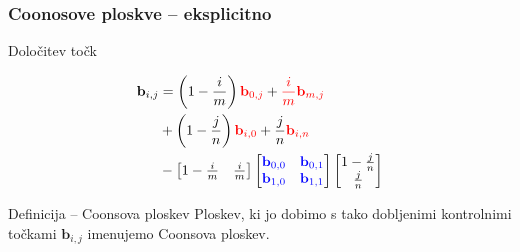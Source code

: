 \documentclass{beamer}
\begin{document}
\begin{frame}
    \frametitle{Coonosove ploskve -- eksplicitno}
    \begin{block}{Določitev točk}
    
        \begin{align*}
            \mathbf{b}_{i,j} &= \left(1 - \frac{i}{m}\right) \color{red} \mathbf{b}_{0,j} \color{black}+\color{red}\frac{i}{m}\mathbf{b}_{m,j}\\
             &+ \left(1 - \frac{j}{n}\right)\color{red}\mathbf{b}_{i,0} \color{black}+\frac{j}{n} \color{red}\mathbf{b}_{i,n}\ \\
            &- 
            \begin{bmatrix} 
               1 - \frac{i}{m} & \frac{i}{m}
            \end{bmatrix}
            \begin{bmatrix} 
                \color{blue} \mathbf{b}_{0,0} &  \color{blue} \mathbf{b}_{0,1}\\
                \color{blue} \mathbf{b}_{1,0} &  \color{blue} \mathbf{b}_{1,1}
            \end{bmatrix}
            \begin{bmatrix}
               1 - \frac{j}{n}\\
               \frac{j}{n}
            \end{bmatrix}
         \end{align*}
\end{block}
    

\begin{block}{Definicija -- Coonsova ploskev}
    Ploskev, ki jo dobimo s tako dobljenimi kontrolnimi točkami $\mathbf{b}_{i,j}$
imenujemo Coonsova ploskev.

\end{block}

\end{frame}
\end{document}
